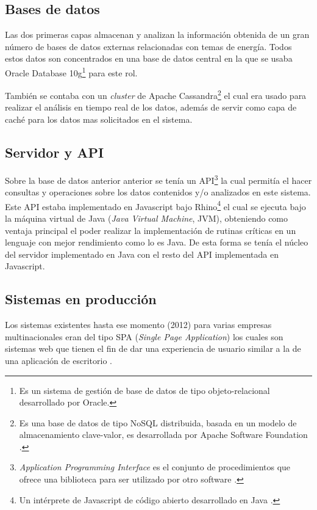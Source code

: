 \subsection{Bases de datos}
Las dos primeras capas almacenan y analizan la información obtenida
de un gran número de bases de datos externas relacionadas con temas
de energía. Todos estos datos son concentrados en una base de datos
central en la que se usaba Oracle Database 10g\footnote{Es un sistema de
  gestión de base de datos de tipo objeto-relacional desarrollado por Oracle.}
para este rol.

También se contaba con un \textit{cluster} de Apache Cassandra\footnote{Es
  una base de datos de tipo NoSQL distribuida, basada en un modelo de
  almacenamiento clave-valor, es desarrollada por Apache Software
  Foundation \cite{19_apache_cassandra}.} el cual era usado para realizar
el análisis en tiempo real de los datos, además de servir como capa
de caché para los datos mas solicitados en el sistema.

\subsection{Servidor y API}
Sobre la base de datos anterior anterior se tenía un API\footnote{
  \textit{Application Programming Interface} es el conjunto de procedimientos
  que ofrece una biblioteca para ser utilizado por otro
  software \cite{3_sommerville_2011}.}
la cual permitía el hacer consultas y operaciones sobre los datos contenidos
y/o analizados en este sistema.
Este API estaba implementado en Javascript bajo Rhino\footnote{Un intérprete
  de Javascript de código abierto desarrollado en Java \cite{20_mozilla_rhino}.}
el cual se ejecuta bajo la máquina virtual de Java (\textit{Java Virtual Machine},
JVM), obteniendo como ventaja principal el poder realizar la implementación
de rutinas críticas en un lenguaje con mejor rendimiento como lo es Java.
De esta forma se tenía el núcleo del servidor implementado en Java con el
resto del API implementada en Javascript.

\subsection{Sistemas en producción}
Los sistemas existentes hasta ese momento (2012) para varias empresas multinacionales
eran del tipo SPA (\textit{Single Page Application}) los cuales son sistemas web
que tienen el fin de dar una experiencia de usuario similar a la
de una aplicación de escritorio \cite{21_mikowski_powell}.

